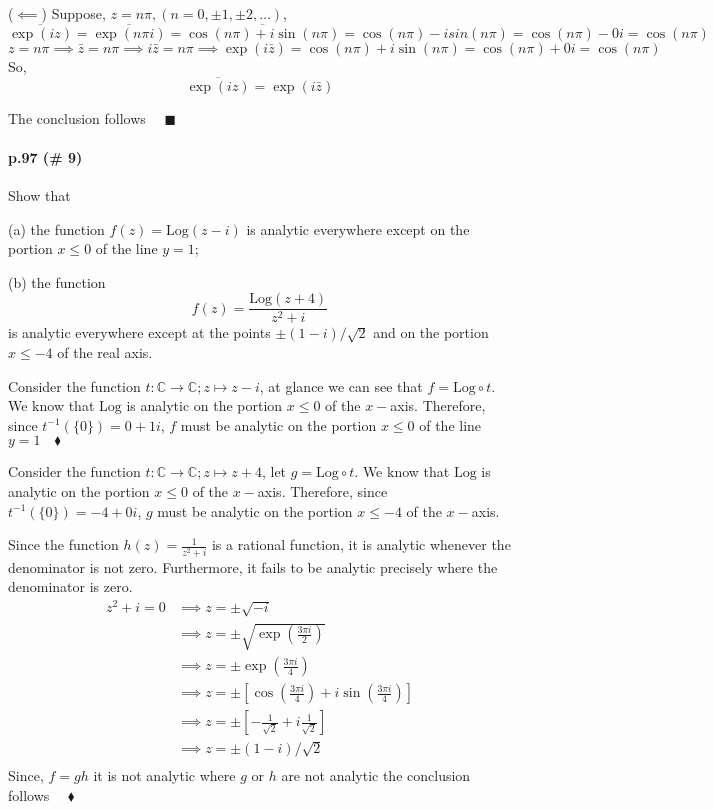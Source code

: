 \documentclass{article}
\newcommand\C{\mathbb{C}}
\begin{document}
($\impliedby$) Suppose, $z = n\pi, (n = 0,\pm 1,\pm 2, \dots)$,
\[\overline{\exp(iz)} = \overline{\exp(n\pi i)}=
  \overline{\cos(n\pi)+i\sin(n\pi)}= \cos(n\pi)-i sin(n\pi) =
  \cos(n\pi) -0i = \cos(n\pi)\]
\[z = n\pi \implies \bar{z} = n\pi \implies i\bar{z} = n\pi \implies
  \exp(i\bar{z}) = \cos(n\pi) +i\sin(n\pi) = \cos(n\pi)+0i =
  \cos(n\pi)\]
So,
\[\overline{\exp(iz)} = \exp(i\bar{z})\]

The conclusion follows $\quad\blacksquare$
\newpage
\paragraph{p.97 \color{blue} (\# 9)\color{black}}

Show that

(a) the function $f(z) = \text{Log}(z-i)$ is analytic everywhere
except on the portion $x\leq 0$ of the line $y = 1$;

(b) the function\[f(z) = \frac{\text{Log}(z+4)}{z^2 + i}\] is analytic
everywhere except at the points $\pm(1-i)/\sqrt{2}$ and on the portion
$x\leq -4$ of the real axis.
\vspace{1.618em}


Consider the function $t:\C\rightarrow\C; z\mapsto z-i$, at glance we
can see that $f = \text{Log}\circ t$. We know that $\text{Log}$ is
analytic on the portion $x\leq 0$ of the $x-$axis. Therefore, since
$t^{-1}(\{0\}) = 0+1i$, $f$ must be analytic on the portion $x\leq 0$
of the line $y = 1\quad \blacklozenge$
\vspace{1.618em}


Consider the function $t:\C\rightarrow\C; z\mapsto z+4$, let $ g =
\text{Log}\circ t$. We know that $\text{Log}$ is
analytic on the portion $x\leq 0$ of the $x-$axis. Therefore, since
$t^{-1}(\{0\}) = -4+0i$, $g$ must be analytic on the portion $x\leq -4$
of the $x-$axis.

Since the function $h(z) = \frac{1}{z^2 +i}$ is a rational function,
it is analytic whenever the denominator is not zero. Furthermore, it
fails to be analytic precisely where the denominator is zero.
\begin{align*} z^2 +i = 0 &\implies z = \pm\sqrt{-i}\\
                          &\implies z =
                            \pm\sqrt{\exp\left(\frac{3\pi
                            i}{2}\right)}\\
  &\implies z =
                            \pm\exp\left(\frac{3\pi
    i}{4}\right)\\
  &\implies z =
    \pm\left[\cos\left(\frac{3\pi
    i}{4}\right) +i \sin\left(\frac{3\pi
    i}{4}\right)\right]\\
  &\implies z =
    \pm\left[-\frac{1}{\sqrt{2}}+ i \frac{1}{\sqrt{2}}\right]\\
  &\implies z = \pm(1-i)/\sqrt{2}\\
\end{align*}
Since, $f = gh$ it is not analytic where $g$ or $h$ are not
analytic the conclusion follows $\quad \blacklozenge$
\newpage
\end{document}
